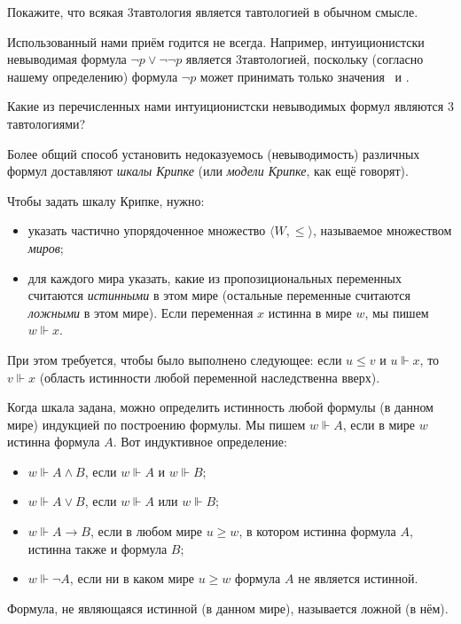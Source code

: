 \begin{problem}
Покажите, что всякая $3$\д тавтология является тавтологией
в обычном смысле.
\end{problem}

Использованный нами приём годится не всегда. Например,
интуиционистски невыводимая формула $\lnot p \lor\lnot\lnot p$
является $3$\д тавтологией, поскольку (согласно нашему
определению) формула $\lnot p$ может принимать только значения
\И\ и \Л.

\begin{problem}
Какие из перечисленных нами интуиционистски невыводимых
формул являются $3$\д тавтологиями?
\end{problem}

Более общий способ установить недоказуемось (невыводимость)
различных формул доставляют \emph{шкалы Крипке}%
%
(или
\emph{модели Крипке},%
как ещё говорят).

Чтобы задать шкалу Крипке, нужно:
        \begin{itemize}
\item указать
  частично упорядоченное множество $\langle W,\le\rangle$, называемое
  множеством \emph{миров};%
\item для каждого мира указать, какие из пропозициональных
  переменных считаются \emph{истинными}%
%
  в этом мире
  (остальные переменные считаются \emph{ложными}%
%
   в этом мире).
  Если переменная $x$ истинна в мире $w$,
   мы пишем $w\Vdash x$.
        \end{itemize}
При этом требуется, чтобы было выполнено следующее: если $u\le
v$ и $u\Vdash x$, то $v\Vdash x$ (область истинности любой
переменной наследственна вверх).

Когда шкала задана, можно определить истинность любой формулы (в
данном мире) индукцией по построению формулы. Мы пишем $w\Vdash
A$, если в мире $w$ истинна формула $A$. Вот индуктивное
определение:

\begin{itemize}
        \item
$w\Vdash  A\land B$, если $w\Vdash A$ и $w\Vdash B$;
        \item
$w\Vdash  A\lor B$, если $w\Vdash A$ или $w\Vdash B$;
        \item
$w\Vdash  A\to B$, если в любом мире $u\ge w$, в котором
                истинна формула $A$, истинна также и формула $B$;
        \item
$w\Vdash\neg  A$, если ни в каком мире $u\ge w$ формула $A$ не
                является истинной.
\end{itemize}
Формула, не являющаяся истинной (в данном мире), называется
ложной (в нём).


